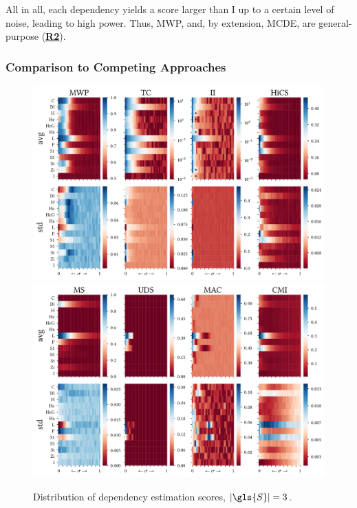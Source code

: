 All in all, each dependency yields a score larger than I up to a certain level of noise, leading to high power. Thus, \gls{MWP}, and, by extension, \gls{MCDE}, are general-purpose (\hyperlink{R2}{\textbf{R2}}).

\subsubsection{Comparison to Competing Approaches}

\begin{figure}
	\centering
	\includegraphics[width=1.0\linewidth]{part2-figures/Fig6_large_1-2_thesis-compressed.pdf}
	\hfill
	\includegraphics[width=1.0\linewidth]{part2-figures/Fig6_large_2-2_thesis-compressed.pdf}
	\caption{Distribution of dependency estimation scores, $|\gls{S}|=3$.}
	\label{fig:contrast_all}
\end{figure} 

